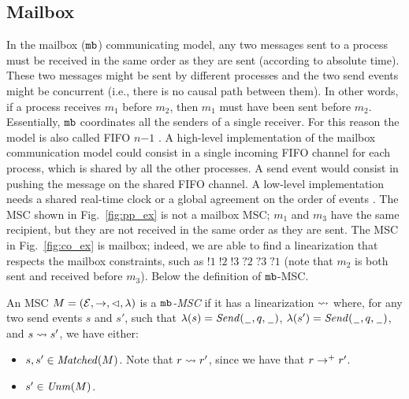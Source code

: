 \subsection{Mailbox}
In the mailbox ($\mathtt{mb}$) communicating model, any two messages sent to a process  must be received in the same order as they are sent (according to absolute time). These two messages might be sent by different processes and the two send events might be concurrent (i.e., there is no causal path between them). In other words, if a process  receives $m_1$ before $m_2$, then $m_1$ must have been sent before $m_2$. Essentially, $\mathtt{mb}$ coordinates all the senders of a single receiver. For this reason the model is also called FIFO $n\mathsf{-}1$ \cite{DBLP:journals/fac/ChevrouHQ16}.   A high-level implementation of the mailbox communication model could consist in a single incoming FIFO channel for each process, which is shared by all the other processes. A send event would consist in pushing the message on the shared FIFO channel.
A low-level implementation needs a shared real-time clock \cite{cristian1999timed} or a global agreement on the order of events \cite{defago2004total, raynal2010communication}.
The MSC shown in Fig.~\ref{fig:pp_ex} is not a mailbox MSC; $m_1$ and $m_3$ have the same recipient, but they are not received in the same order as they are sent. The MSC in Fig.~\ref{fig:co_ex} is mailbox; indeed, we are able to find a linearization that respects the mailbox constraints, such as $!1\;!2\;!3\;?2\;?3\;?1$ (note that $m_2$ is both sent and received before $m_3$). Below the definition of $\mathtt{mb}$-MSC.

\begin{definition}\label{def:mb_msc}
	An MSC $M = (\mathcal{E},\to,\lhd,\lambda)$ is a \emph{$\mathtt{mb}$-MSC} if it has a linearization $\rightsquigarrow$ where, for any two send events $s$ and $s'$, such that $\lambda(s)={\mathit{Send}(\hspace{0.1em}\underline{\hspace{0.5em}}\hspace{0.1em},q,\hspace{0.1em}\underline{\hspace{0.5em}}\hspace{0.1em})}$, $\lambda(s')={\mathit{Send}(\hspace{0.1em}\underline{\hspace{0.5em}}\hspace{0.1em},q,\hspace{0.1em}\underline{\hspace{0.5em}}\hspace{0.1em})}$, and $s \rightsquigarrow s'$, we have either:
	\begin{itemize}%
		\item $s,s' \in \mathit{Matched}(M)$. Note that $r \rightsquigarrow r'$, since we have that $r \to^+ r'$.
		\item $s' \in \mathit{Unm}(M)$.
	\end{itemize}
\end{definition}

